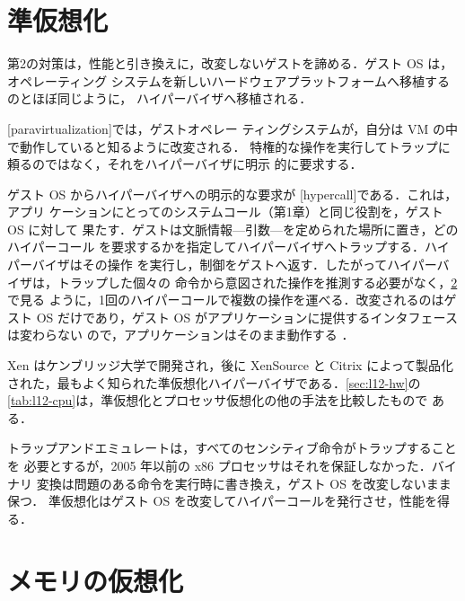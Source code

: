 \documentclass[../main.tex]{subfiles}
\begin{document}
\section{準仮想化}
\label{sec:l12-pv}

第2の対策は，性能と引き換えに，改変しないゲストを諦める．ゲスト OS は，オペレーティング
システムを新しいハードウェアプラットフォームへ移植するのとほぼ同じように，
ハイパーバイザへ移植される．

\begin{definition}[準仮想化]
  [paravirtualization]では，ゲストオペレー
  ティングシステムが，自分は VM の中で動作していると知るように改変される．
  特権的な操作を実行してトラップに頼るのではなく，それをハイパーバイザに明示
  的に要求する．
\end{definition}

ゲスト OS からハイパーバイザへの明示的な要求が
[hypercall]である．これは，アプリ
ケーションにとってのシステムコール（第1章）と同じ役割を，ゲスト OS に対して
果たす．ゲストは文脈情報---引数---を定められた場所に置き，どのハイパーコール
を要求するかを指定してハイパーバイザへトラップする．ハイパーバイザはその操作
を実行し，制御をゲストへ返す．したがってハイパーバイザは，トラップした個々の
命令から意図された操作を推測する必要がなく，\cref{sec:l12-memory}で見る
ように，1回のハイパーコールで複数の操作を運べる．改変されるのはゲスト OS
だけであり，ゲスト OS がアプリケーションに提供するインタフェースは変わらない
ので，アプリケーションはそのまま動作する \cite{barham2003}．

Xen はケンブリッジ大学で開発され，後に XenSource と Citrix によって製品化
された，最もよく知られた準仮想化ハイパーバイザである．\cref{sec:l12-hw}の
\cref{tab:l12-cpu}は，準仮想化とプロセッサ仮想化の他の手法を比較したもので
ある．

\begin{keypoint}
  トラップアンドエミュレートは，すべてのセンシティブ命令がトラップすることを
  必要とするが，2005 年以前の x86 プロセッサはそれを保証しなかった．バイナリ
  変換は問題のある命令を実行時に書き換え，ゲスト OS を改変しないまま保つ．
  準仮想化はゲスト OS を改変してハイパーコールを発行させ，性能を得る．
\end{keypoint}

\section{メモリの仮想化}
\label{sec:l12-memory}
\end{document}
